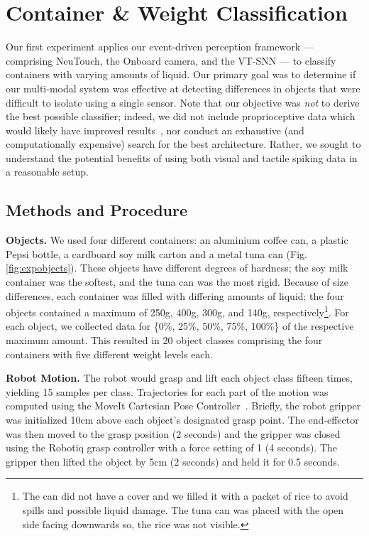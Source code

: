 \documentclass[fyp]{socreport}
\begin{document}
\section{Container \& Weight Classification\label{sec:container_class}}

Our first experiment applies our event-driven perception framework ---
comprising NeuTouch, the Onboard camera, and the VT-SNN --- to classify
containers with varying amounts of liquid. Our primary goal was to determine if
our multi-modal system was effective at detecting differences in objects that
were difficult to isolate using a single sensor. Note that our objective was
\emph{not} to derive the {best possible classifier}; indeed, we did not include
proprioceptive data which would likely have improved
results~\cite{lee2019making}, nor conduct an exhaustive (and computationally
expensive) search for the best architecture. Rather, we sought to understand the
potential benefits of using both visual and tactile spiking data in a reasonable
setup.

\subsection{Methods and Procedure}

\noindent\textbf{Objects.} We used four different containers: an aluminium
coffee can, a plastic Pepsi bottle, a cardboard soy milk carton and a metal tuna
can (Fig. \ref{fig:expobjects}). These objects have different degrees of
hardness; the soy milk container was the softest, and the tuna can was the most
rigid. Because of size differences, each container was filled with differing
amounts of liquid; the four objects contained a maximum of 250g, 400g, 300g, and
140g, respectively\footnote{The can did not have a cover and we filled it with a
  packet of rice to avoid spills and possible liquid damage. The tuna can was
  placed with the open side facing downwards so, the rice was not visible.}. For
each object, we collected data for \{0\%, 25\%, 50\%, 75\%, 100\%\} of the
respective maximum amount. This resulted in 20 object classes comprising the
four containers with five different weight levels each.

\noindent\textbf{Robot Motion.} The robot would grasp and lift each object class
fifteen times, yielding 15 samples per class. Trajectories for each part of the
motion was computed using the MoveIt Cartesian Pose
Controller~\cite{coleman2014reducing}. Briefly, the robot gripper was
initialized 10cm above each object's designated grasp point. The end-effector
was then moved to the grasp position (2 seconds) and the gripper was closed
using the Robotiq grasp controller with a force setting of 1 (4 seconds). The
gripper then lifted the object by 5cm (2 seconds) and held it for 0.5 seconds.
\end{document}
